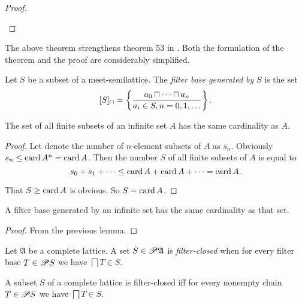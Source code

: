 \begin{proof}
\begin{description}
\begin{description}
\end{description}
\end{description}
\end{proof}
\begin{rem}
The above theorem strengthens theorem 53 in \cite{filters}. Both
the formulation of the theorem and the proof are considerably simplified.\end{rem}
\begin{defn}
Let $S$ be a subset of a meet-semilattice.
The \emph{filter base generated by} $S$ is the set
\[
[S]_{\sqcap}=\left\{ \frac{a_{0}\sqcap\dots\sqcap a_{n}}{a_{i}\in S,n=0,1,\dots}\right\}.
\]
\end{defn}
\begin{lem}
The set of all finite subsets of an infinite set $A$ has the same
cardinality as $A$.\end{lem}
\begin{proof}
Let denote the number of $n$-element subsets of $A$ as $s_{n}$.
Obviously $s_{n}\le\operatorname{card} A^{n}=\operatorname{card} A$. Then the number $S$ of
all finite subsets of $A$ is equal to
\[
s_{0}+s_{1}+\dots\le\operatorname{card} A+\operatorname{card} A+\dots=\operatorname{card} A.
\]


That $S\ge\operatorname{card} A$ is obvious. So $S=\operatorname{card} A$.\end{proof}
\begin{lem}
A filter base generated by an infinite set has the same cardinality
as that set.\end{lem}
\begin{proof}
From the previous lemma.\end{proof}
\begin{defn}
Let $\mathfrak{A}$ be a complete lattice. A
set $S\in\mathscr{P}\mathfrak{A}$ is \emph{filter-closed} when for every
filter base $T\in\mathscr{P} S$ we have $\bigsqcap T\in S$.\end{defn}
\begin{thm}\label{fclosed}
A subset $S$ of a complete lattice is filter-closed iff for every
nonempty chain $T\in\mathscr{P} S$ we have $\bigsqcap T\in S$.\end{thm}
